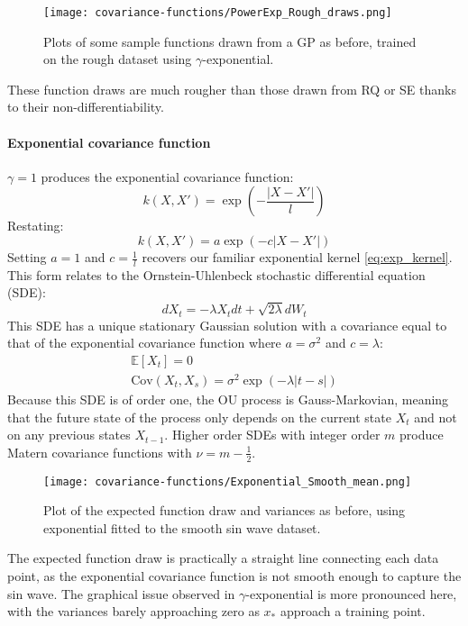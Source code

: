 \begin{figure}[H]
    \texttt{[image: covariance-functions/PowerExp\_Rough\_draws.png]}
    \caption{
        Plots of some sample functions drawn from a GP as before, trained on the rough dataset using $\gamma$-exponential. \\
    }
\end{figure}
These function draws are much rougher than those drawn from RQ or SE thanks to their non-differentiability.

\paragraph{Exponential covariance function}
$\gamma = 1$ produces the exponential covariance function:
\begin{equation*}
    k(X,X') = \exp \left(-\frac{|X - X'|}{l} \right)
\end{equation*}
Restating:
\begin{equation*}
    k(X, X') = a \exp\left(-c |X - X'|\right)
\end{equation*}
    Setting $a = 1$ and $c = \frac{1}{l}$ recovers our familiar exponential kernel \ref{eq:exp_kernel}. This form relates to the Ornstein-Uhlenbeck \cite{orny} stochastic differential equation (SDE):
\begin{equation*}
    dX_t = -\lambda X_t dt + \sqrt{2\lambda} dW_t
\end{equation*}
    This SDE has a unique stationary Gaussian solution \cite{orny} with a covariance equal to that of the exponential covariance function where $a = \sigma^2$ and $c = \lambda$:
\begin{equation*}
    \begin{aligned}
        \mathbb{E}[X_t] = 0 \\
        \text{Cov}(X_t, X_s) = \sigma^2 \exp \left( -\lambda |t - s| \right)
    \end{aligned}
\end{equation*}
    Because this SDE is of order one, the OU process is Gauss-Markovian, meaning that the future state of the process only depends on the current state $X_t$ and not on any previous states $X_{t-1}$. Higher order SDEs with integer order $m$ produce Matern covariance functions with $\nu = m - \frac{1}{2}$.

\begin{figure}[H]
    \texttt{[image: covariance-functions/Exponential\_Smooth\_mean.png]}
    \caption{
        Plot of the expected function draw and variances as before, using exponential fitted to the smooth sin wave dataset. \\
    }
\end{figure}
The expected function draw is practically a straight line connecting each data point, as the exponential covariance function is not smooth enough to capture the sin wave. The graphical issue observed in $\gamma$-exponential is more pronounced here, with the variances barely approaching zero as $x_*$ approach a training point.

